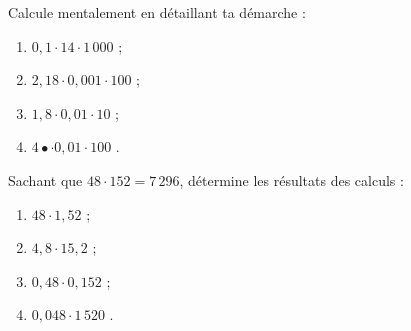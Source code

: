 \begin{exercice}
Calcule mentalement en détaillant ta démarche :
\begin{enumerate} 
 \item $0,1 \cdot 14 \cdot 1\,000$ \dotfill ; \hspace*{11em}
 
 \item $2,18 \cdot 0,001 \cdot 100$ \dotfill ; \hspace*{11em}

 \item $1,8 \cdot 0,01 \cdot 10$ \dotfill ; \hspace*{11em}

 \item $4 •\cdot 0,01 \cdot 100$ \dotfill. \hspace*{11em}

 \end{enumerate} 
\end{exercice}


\begin{exercice}
Sachant que $48 \cdot 152 = 7\,296$, détermine les résultats des calculs :
\begin{enumerate} 
 \item $48 \cdot 1,52$ \dotfill ; \hspace*{11em}
 
 \item $4,8 \cdot 15,2$ \dotfill ; \hspace*{11em}
 
 \item $0,48 \cdot 0,152$ \dotfill ; \hspace*{11em}
 
 \item $0,048 \cdot 1\,520$ \dotfill. \hspace*{11em}

 \end{enumerate} 
\end{exercice}


